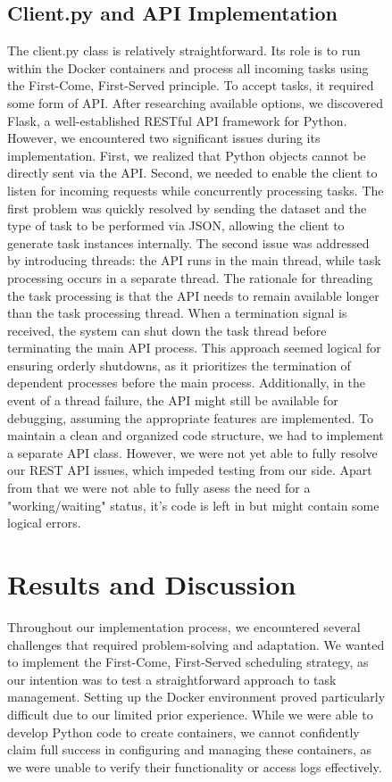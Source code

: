\documentclass{article}
\begin{document}
\begin{figure}[h!]
\subsection{Client.py and API Implementation}
The client.py class is relatively straightforward. Its role is to run within the Docker containers and process all incoming tasks using the First-Come, First-Served principle. To accept tasks, it required some form of API. After researching available options, we discovered Flask, a well-established RESTful API framework for Python.
However, we encountered two significant issues during its implementation. First, we realized that Python objects cannot be directly sent via the API. Second, we needed to enable the client to listen for incoming requests while concurrently processing tasks. The first problem was quickly resolved by sending the dataset and the type of task to be performed via JSON, allowing the client to generate task instances internally. The second issue was addressed by introducing threads: the API runs in the main thread, while task processing occurs in a separate thread. The rationale for threading the task processing is that the API needs to remain available longer than the task processing thread. When a termination signal is received, the system can shut down the task thread before terminating the main API process. This approach seemed logical for ensuring orderly shutdowns, as it prioritizes the termination of dependent processes before the main process. Additionally, in the event of a thread failure, the API might still be available for debugging, assuming the appropriate features are implemented. To maintain a clean and organized code structure, we had to implement a separate API class. However, we were not yet able to fully resolve our REST API issues, which impeded testing from our side. Apart from that we were not able to fully asess the need for a "working/waiting" status, it's code is left in but might contain some logical errors.

\section{Results and Discussion}
Throughout our implementation process, we encountered several challenges that required problem-solving and adaptation. We wanted to implement the First-Come, First-Served scheduling strategy, as our intention was to test a straightforward approach to task management. Setting up the Docker environment proved particularly difficult due to our limited prior experience. While we were able to develop Python code to create containers, we cannot confidently claim full success in configuring and managing these containers, as we were unable to verify their functionality or access logs effectively.


\end{figure}
\end{document}
